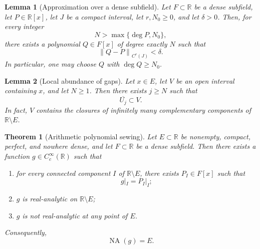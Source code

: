 \documentclass[10pt,a4paper]{amsart}
\newtheorem{lemma}{Lemma}
\newtheorem{theorem}{Theorem}
\newcommand{\NA}{\operatorname{NA}}
\newcommand{\R}{\mathbb R}
\newcommand{\norm}[1]{\left\lVert #1\right\rVert}
\begin{document}
\begin{lemma}[Approximation over a dense subfield]\label{lem:dense-field}
Let $F\subset\R$ be a dense subfield, let $P\in\R[x]$, let $J$ be a compact
interval, let $r,N_0\geq0$, and let $\delta>0$. Then, for every integer
\[
N>\max\{\deg P,N_0\},
\]
there exists a polynomial $Q\in F[x]$ of degree exactly $N$ such that
\[
\norm{Q-P}_{C^r(J)}<\delta.
\]
In particular, one may choose $Q$ with $\deg Q\geq N_0$.
\end{lemma}

\begin{lemma}[Local abundance of gaps]\label{lem:gaps}
Let $x\in E$, let $V$ be an open interval containing $x$, and let $N\geq1$.
Then there exists $j\geq N$ such that
\[
\overline{U_j}\subset V.
\]
In fact, $V$ contains the closures of infinitely many complementary
components of $\R\setminus E$.
\end{lemma}

\begin{theorem}[Arithmetic polynomial sewing]\label{thm:sewing}
Let $E\subset\R$ be nonempty, compact, perfect, and nowhere dense, and let
$F\subset\R$ be a dense subfield. Then there exists a function
$g\in C_c^\infty(\R)$ such that
\begin{enumerate}[label=\textup{(\roman*)}]
\item for every connected component $I$ of $\R\setminus E$, there exists
$P_I\in F[x]$ such that
\[
g|_I=P_I|_I;
\]
\item $g$ is real-analytic on $\R\setminus E$;
\item $g$ is not real-analytic at any point of $E$.
\end{enumerate}
Consequently,
\[
\NA(g)=E.
\]
\end{theorem}
\end{document}
